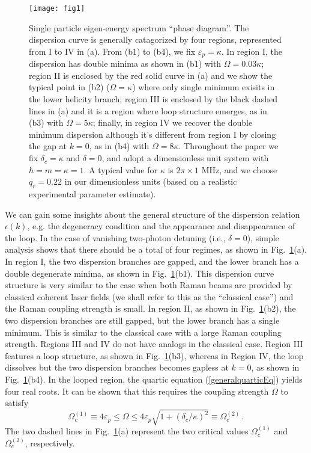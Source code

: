 \documentclass[atoms,article,submit,moreauthors,dvi2pdf,12pt,a4paper]{mdpi}
\begin{document}
\begin{figure}[htp]
\texttt{[image: fig1]}\caption{Single particle eigen-energy spectrum ``phase diagram''.  The dispersion curve is generally catagorized by four regions, represented from I to IV in (a). From (b1) to (b4), we fix $\varepsilon_p=\kappa$. In region I, the dispersion has double minima as shown in (b1) with $\Omega=0.03\kappa$; region II is enclosed by the red solid curve in (a) and we show the typical point in (b2) ($\Omega=\kappa$) where only single minimum exisits in the lower helicity branch; region III is enclosed by the black dashed lines in (a) and it is a region where loop structure emerges, as in (b3) with $\Omega=5\kappa$; finally, in region IV we recover the double minimum dispersion although it's different from region I by closing the gap at $k=0$, as in (b4) with $\Omega=8\kappa$. Throughout the paper we fix $\delta_c=\kappa$ and $\delta=0$, and adopt a dimensionless unit system with $\hbar=m=\kappa=1$. A typical value for $\kappa$ is $2\pi \times 1 \text{ MHz}$, and we choose $q_r = 0.22$ in our dimensionless units (based on a realistic experimental parameter estimate). }\label{fig1}
\end{figure}

We can gain some insights about the general structure of the dispersion relation $\epsilon(k)$, e.g. the degeneracy condition and the appearance and disappearance of the loop. In the case of vanishing two-photon detuning (i.e., $\delta=0$),
simple analysis shows that there should be a total of four regimes, as shown in Fig.~\ref{fig1}(a). In region I, the two dispersion branches are gapped, and the lower branch has a double degenerate minima, as shown in Fig.~\ref{fig1}(b1). This dispersion curve structure is very similar to the case when both Raman beams are provided by classical coherent laser fields (we shall refer to this as the ``classical case'') and the Raman coupling strength is small. In region II, as shown in Fig.~\ref{fig1}(b2), the two dispersion branches are still gapped, but the lower branch has a single minimum. This is similar to the classical case with a large Raman coupling strength. Regions III and IV do not have analogs in the classical case. Region III features a loop structure, as shown in Fig.~\ref{fig1}(b3), whereas in Region IV, the loop dissolves but the two dispersion branches becomes gapless at $k=0$, as shown in Fig.~\ref{fig1}(b4). In the looped region, the quartic equation (\ref{generalquarticEq}) yields four real roots. It can be shown \cite{cavitySOC} that this requires the coupling strength $\Omega$ to satisfy
\[\Omega_c^{(1)}\equiv4\varepsilon_p\leq \Omega \leq  4\varepsilon_p \sqrt{1+(\delta_c/\kappa)^2}\equiv\Omega_c^{(2)} \,.\]
The two dashed lines in Fig.~\ref{fig1}(a) represent the two critical values $\Omega_c^{(1)}$ and $\Omega_c^{(2)}$, respectively.
\end{document}
